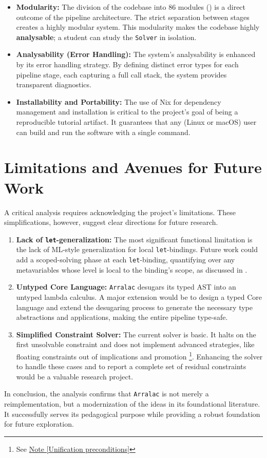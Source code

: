 \begin{itemize}
    \item \textbf{Modularity:} The division of the codebase into 86 modules () is a direct outcome of the pipeline architecture. The strict separation between stages creates a highly modular system. This modularity makes the codebase highly \textbf{analysable}; a student can study the \texttt{Solver} in isolation.
    \item \textbf{Analysability (Error Handling):} The system's analysability is enhanced by its error handling strategy. By defining distinct error types for each pipeline stage, each capturing a full call stack, the system provides transparent diagnostics.
    \item \textbf{Installability and Portability:} The use of Nix for dependency management and installation is critical to the project's goal of being a reproducible tutorial artifact. It guarantees that any (Linux or macOS) user can build and run the software with a single command.
\end{itemize}

\section{Limitations and Avenues for Future Work}
\label{sec:Discussion:Limitations}
A critical analysis requires acknowledging the project's limitations. These simplifications, however, suggest clear directions for future research.

\begin{enumerate}
    \item \textbf{Lack of \texttt{let}-generalization:} The most significant functional limitation is the lack of ML-style generalization for local \texttt{let}-bindings. Future work could add a scoped-solving phase at each \texttt{let}-binding, quantifying over any metavariables whose level is local to the binding's scope, as discussed in \cite{wits-type-inference-using-constraints}.

    \item \textbf{Untyped Core Language:} \texttt{Arralac} desugars its typed AST into an untyped lambda calculus. A major extension would be to design a typed Core language and extend the desugaring process to generate the necessary type abstractions and applications, making the entire pipeline type-safe.

    \item \textbf{Simplified Constraint Solver:} The current solver is basic. It halts on the first unsolvable constraint and does not implement advanced strategies, like floating constraints out of implications and promotion \footnote{See \href{https://github.com/ghc/ghc/blob/ed38c09bd89307a7d3f219e1965a0d9743d0ca73/compiler/GHC/Tc/Utils/Unify.hs\#L2589}{Note [Unification preconditions]}}. Enhancing the solver to handle these cases and to report a complete set of residual constraints would be a valuable research project.
\end{enumerate}

In conclusion, the analysis confirms that \texttt{Arralac} is not merely a reimplementation, but a modernization of the ideas in its foundational literature. It successfully serves its pedagogical purpose while providing a robust foundation for future exploration.